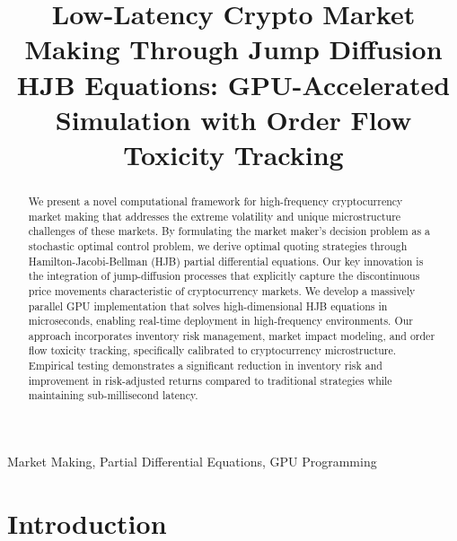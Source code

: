 \documentclass[onecolumn,ieee]{arithmaxresearch}
\begin{document}
\title{Low-Latency Crypto Market Making Through Jump Diffusion HJB Equations: GPU-Accelerated Simulation with Order Flow Toxicity Tracking}


\maketitle

\begin{center}
\vspace{-1em}
\arithmaxtitlelogo[3.5cm]
\vspace{0.5em}
\end{center}

\begin{abstract}
We present a novel computational framework for high-frequency cryptocurrency market making that addresses the extreme volatility and unique microstructure challenges of these markets. By formulating the market maker's decision problem as a stochastic optimal control problem, we derive optimal quoting strategies through Hamilton-Jacobi-Bellman (HJB) partial differential equations. Our key innovation is the integration of jump-diffusion processes that explicitly capture the discontinuous price movements characteristic of cryptocurrency markets. We develop a massively parallel GPU implementation that solves high-dimensional HJB equations in microseconds, enabling real-time deployment in high-frequency environments. Our approach incorporates inventory risk management, market impact modeling, and order flow toxicity tracking, specifically calibrated to cryptocurrency microstructure. Empirical testing demonstrates a significant reduction in inventory risk and improvement in risk-adjusted returns compared to traditional strategies while maintaining sub-millisecond latency.
\end{abstract}

\begin{IEEEkeywords}
Market Making, Partial Differential Equations, GPU Programming
\end{IEEEkeywords}

\section{Introduction}
\end{document}
